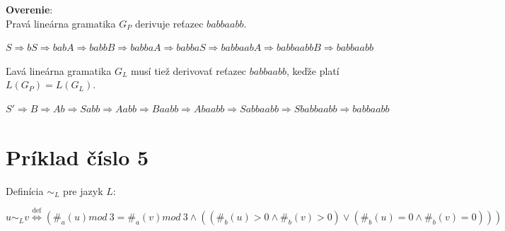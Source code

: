 \documentclass[11pt,a4paper]{article}
\begin{document}
\textbf{Overenie}:\\
Pravá lineárna gramatika $G_P$ derivuje reťazec $babbaabb$.
\begin{center}
$S \Rightarrow bS \Rightarrow babA  \Rightarrow babbB \Rightarrow babbaA \Rightarrow babbaS \Rightarrow babbaabA \Rightarrow babbaabbB \Rightarrow babbaabb$
\end{center}

Ľavá lineárna gramatika $G_L$ musí tiež derivovať reťazec $babbaabb$, keďže platí $L(G_P)=L(G_L)$.
\begin{center}
$S' \Rightarrow B \Rightarrow Ab \Rightarrow Sabb \Rightarrow Aabb \Rightarrow Baabb \Rightarrow Abaabb \Rightarrow Sabbaabb \Rightarrow Sbabbaabb \Rightarrow babbaabb$
\end{center}

\section{Príklad číslo 5}

Definícia $\sim_L$ pre jazyk $L$:\\[-1.5em]
\begin{center}
$u \sim_L v \stackrel{\text{def}}{\Longleftrightarrow} (\#_a(u)mod\ 3 = \#_a(v)mod\ 3 \wedge ((\#_b(u) > 0 \wedge \#_b(v) > 0) \vee (\#_b(u) = 0 \wedge \#_b(v) = 0)))$
\end{center}
\end{document}

